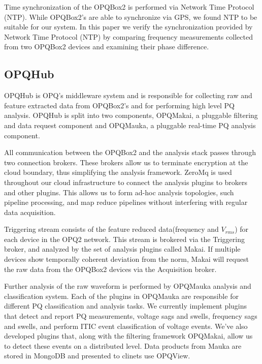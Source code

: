 \documentclass[a4paper, conference]{IEEEtran}
\begin{document}
Time synchronization of the OPQBox2 is performed via Network Time Protocol (NTP).\cite{mills1991internet} While OPQBox2's are able to synchronize via GPS, we found NTP to be suitable for our system. In this paper we verify the synchronization provided by Network Time Protocol (NTP) by comparing frequency measurements collected from two OPQBox2 devices and examining their phase difference.


\subsection{OPQHub}
OPQHub is OPQ's middleware system and is responsible for collecting raw and feature extracted data from OPQBox2's and for performing high level PQ analysis.  OPQHub is split into two components, OPQMakai, a pluggable filtering and data request component and OPQMauka, a pluggable real-time PQ analysis component.

All communication between the OPQBox2 and the analysis stack passes through two connection brokers. These brokers allow us to terminate encryption at the cloud boundary, thus simplifying the analysis framework. ZeroMq is used throughout our cloud infrastructure to connect the analysis plugins to brokers and other plugins. This allows us to form ad-hoc analysis topologies, such pipeline processing, and map reduce pipelines without interfering with regular data acquisition.

Triggering stream consists of the feature reduced data(frequency and $V_{rms}$) for each device in the OPQ2 network. This stream is brokered via the Triggering broker, and analyzed by the set of analysis plugins called Makai. If multiple devices show temporally coherent deviation from the norm, Makai will request the raw data from the OPQBox2 devices via the Acquisition broker. 

Further analysis of the raw waveform is performed by OPQMauka analysis and classification system.  Each of the plugins in OPQMauka are responsible for different PQ classification and analysis tasks. We currently implement plugins that detect and report PQ measurements, voltage sags and swells, frequency sags and swells, and perform ITIC event classification of voltage events. We've also developed plugins that, along with the filtering framework OPQMakai, allow us to detect these events on a distributed level. Data products from Mauka are stored in MongoDB and presented to clinets use OPQView.\cite{abramova2013nosql}
\end{document}
